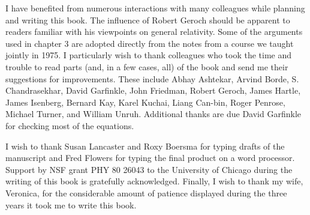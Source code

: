 I have benefited from numerous interactions with many colleagues while planning and writing this book. The influence of Robert Geroch should be apparent to readers familiar with his viewpoints on general relativity. Some of the arguments used in chapter 3 are adopted directly from the notes from a course we taught jointly in 1975. I particularly wish to thank colleagues who took the time and trouble to read parts (and, in a few cases, all) of the book and send me their suggestions for improvements. These include Abhay Ashtekar, Arvind Borde, S. Chandrasekhar, David Garfinkle, John Friedman, Robert Geroch, James Hartle, James Isenberg, Bernard Kay, Karel Kuchai, Liang Can-bin, Roger Penrose, Michael Turner, and William Unruh. Additional thanks are due David Garfinkle for checking most of the equations.

I wish to thank Susan Lancaster and Roxy Boersma for typing drafts of the manuscript and Fred Flowers for typing the final product on a word processor. Support by NSF grant PHY 80 26043 to the University of Chicago during the writing of this book is gratefully acknowledged. Finally, I wish to thank my wife, Veronica, for the considerable amount of patience displayed during the three years it took me to write this book.